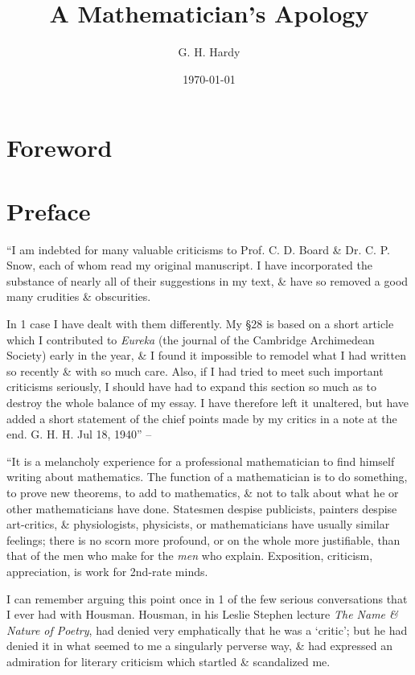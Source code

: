 \documentclass{article}
\title{A Mathematician's Apology}
\author{G. H. Hardy}
\date{\today}
\numberwithin{equation}{section}
\begin{document}
\maketitle
\tableofcontents


\section{Foreword}


\section{Preface}
``I am indebted for many valuable criticisms to Prof. C. D. Board \& Dr. C. P. Snow, each of whom read my original manuscript. I have incorporated the substance of nearly all of their suggestions in my text, \& have so removed a good many crudities \& obscurities.

In 1 case I have dealt with them differently. My \S28 is based on a short article which I contributed to \textit{Eureka} (the journal of the Cambridge Archimedean Society) early in the year, \& I found it impossible to remodel what I had written so recently \& with so much care. Also, if I had tried to meet such important criticisms seriously, I should have had to expand this section so much as to destroy the whole balance of my essay. I have therefore left it unaltered, but have added a short statement of the chief points made by my critics in a note at the end. G. H. H. Jul 18, 1940'' -- \cite[p. 59]{Hardy1992}

 ``It is a melancholy experience for a professional mathematician to find himself writing about mathematics. The function of a mathematician is to do something, to prove new theorems, to add to mathematics, \& not to talk about what he or other mathematicians have done. Statesmen despise publicists, painters despise art-critics, \& physiologists, physicists, or mathematicians have usually similar feelings; there is no scorn more profound, or on the whole more justifiable, than that of the men who make for the \textit{men} who explain. Exposition, criticism, appreciation, is work for 2nd-rate minds.

I can remember arguing this point once in 1 of the few serious conversations that I ever had with Housman. Housman, in his Leslie Stephen lecture \textit{The Name \& Nature of Poetry}, had denied very emphatically that he was a `critic'; but he had denied it in what seemed to me a singularly perverse way, \& had expressed an admiration for literary criticism which startled \& scandalized me.
\end{document}
